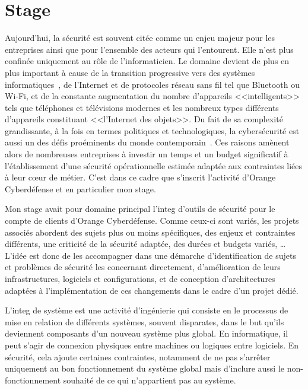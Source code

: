 \documentclass[12pt, oneside, a4paper, titlepage]{report}
\begin{document}
\section{Stage}%
\label{sec:intro::stage}

Aujourd'hui, la sécurité est souvent citée comme un enjeu majeur pour les
entreprises ainsi que pour l'ensemble des acteurs qui l'entourent. Elle n'est
plus confinée uniquement au rôle de l'informaticien. Le domaine devient de plus
en plus important à cause de la transition progressive vers des systèmes
informatiques~\cite{reliance}, de l'Internet et de protocoles réseau sans fil
tel que Bluetooth ou Wi-Fi, et de la constante augmentation du nombre
d'appareils <<intelligents>> tels que téléphones et télévisions modernes et les
nombreux types différents d'appareils constituant <<l'Internet des objets>>. Du
fait de sa complexité grandissante, à la fois en termes politiques et
technologiques, la cybersécurité est aussi un des défis proéminents du monde
contemporain~\cite{global-cyber}. Ces raisons amènent alors de nombreuses
entreprises à investir un temps et un budget significatif à l'établissement
d'une sécurité opérationnelle estimée adaptée aux contraintes liées à leur cœur
de métier. C'est dans ce cadre que s'inscrit l'activité d'Orange Cyberdéfense et
en particulier mon stage.

Mon stage avait pour domaine principal l'\gls{integ} d'outils de sécurité pour
le compte de clients d'Orange Cyberdéfense. Comme ceux-ci sont variés, les
projets associés abordent des sujets plus ou moins spécifiques, des enjeux et
contraintes différents, une criticité de la sécurité adaptée, des durées et
budgets variés, \ldots{} L'idée est donc de les accompagner dans une démarche
d'identification de sujets et problèmes de sécurité les concernant directement,
d'amélioration de leurs infrastructures, logiciels et configurations, et de
conception d'architectures adaptées à l'implémentation de ces changements dans
le cadre d'un projet dédié.

L'\gls{integ} de système est une activité d'ingénierie qui consiste en le
processus de mise en relation de différents systèmes, souvent disparates, dans
le but qu'ils deviennent composants d'un nouveau système plus global. En
informatique, il peut s'agir de connexion physiques entre machines ou logiques
entre logiciels. En sécurité, cela ajoute certaines contraintes, notamment de ne
pas s'arrêter uniquement au bon fonctionnement du système global mais d'inclure
aussi le non-fonctionnement souhaité de ce qui n'appartient pas au système.
\end{document}
